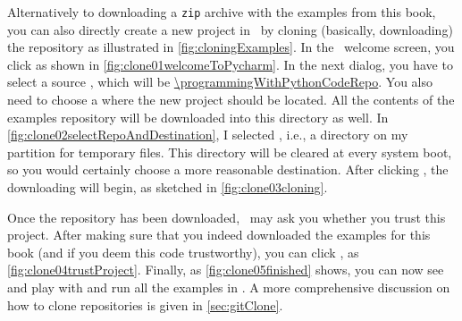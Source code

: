 %
\begin{sloppypar}%
Alternatively to downloading a \texttt{zip} archive with the examples from this book, you can also directly create a new project in \pycharm\ by cloning (basically, downloading) the repository as illustrated in \cref{fig:cloningExamples}.
In the \pycharm\ welcome screen, you click  as shown in \cref{fig:clone01welcomeToPycharm}.
In the next dialog, you have to select a source , which will be \expandafter\url{\programmingWithPythonCodeRepo}.
You also need to choose a  where the new project should be located.
All the contents of the examples repository will be downloaded into this directory as well.
In \cref{fig:clone02selectRepoAndDestination}, I selected , i.e., a directory on my partition for temporary files.
This directory will be cleared at every system boot, so you would certainly choose a more reasonable destination.
After clicking , the downloading will begin, as sketched in \cref{fig:clone03cloning}.%
\end{sloppypar}%
%
Once the repository has been downloaded, \pycharm\ may ask you whether you trust this project.
After making sure that you indeed downloaded the examples for this book (and if you deem this code trustworthy), you can click , as \cref{fig:clone04trustProject}.
Finally, as \cref{fig:clone05finished} shows, you can now see and play with and run all the examples in \pycharm.
A more comprehensive discussion on how to clone repositories is given in \cref{sec:gitClone}.%
%
\endhsection%
%
